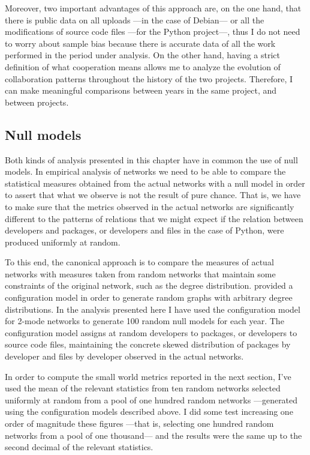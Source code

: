 Moreover, two important advantages of this approach are, on the one hand, that there is public data on all uploads ---in the case of Debian--- or all the modifications of source code files ---for the Python project---, thus I do not need to worry about sample bias because there is accurate data of all the work performed in the period under analysis. On the other hand, having a strict definition of what cooperation means allows me to analyze the evolution of collaboration patterns throughout the history of the two projects. Therefore, I can make meaningful comparisons between years in the same project, and between projects.

\subsection{Null models}

Both kinds of analysis presented in this chapter have in common the use of null models. In empirical analysis of networks we need to be able to compare the statistical measures obtained from the actual networks with a null model in order to assert that what we observe is not the result of pure chance. That is, we have to make sure that the metrics observed in the actual networks are significantly different to the patterns of relations that we might expect if the relation between developers and packages, or developers and files in the case of Python, were produced uniformly at random.

To this end, the canonical approach is to compare the measures of actual networks with measures taken from random networks that maintain some constraints of the original network, such as the degree distribution. \citet*{newman:2003,nsw:2001} provided a configuration model in order to generate random graphs with arbitrary degree distributions. In the analysis presented here I have used the configuration model for 2-mode networks to generate 100 random null models for each year. The configuration model assigns at random developers to packages, or developers to source code files, maintaining the concrete skewed distribution of packages by developer and files by developer observed in the actual networks.

In order to compute the small world metrics reported in the next section, I've used the mean of the relevant statistics from ten random networks selected uniformly at random from a pool of one hundred random networks ---generated using the configuration models described above. I did some test increasing one order of magnitude these figures ---that is, selecting one hundred random networks from a pool of one thousand--- and the results were the same up to the second decimal of the relevant statistics.

